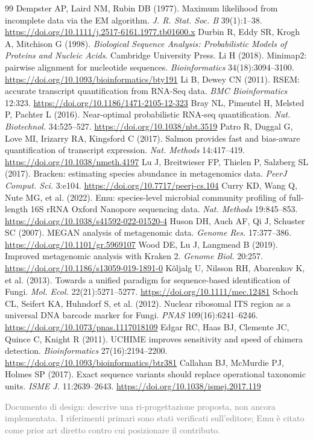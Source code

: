\documentclass[11pt,a4paper]{article}
\begin{document}
\begin{thebibliography}{99}\small
{} Dempster AP, Laird NM, Rubin DB (1977). Maximum likelihood from incomplete data via the EM algorithm. \emph{J. R. Stat. Soc. B} 39(1):1--38. \url{https://doi.org/10.1111/j.2517-6161.1977.tb01600.x}
 Durbin R, Eddy SR, Krogh A, Mitchison G (1998). \emph{Biological Sequence Analysis: Probabilistic Models of Proteins and Nucleic Acids}. Cambridge University Press.
 Li H (2018). Minimap2: pairwise alignment for nucleotide sequences. \emph{Bioinformatics} 34(18):3094--3100. \url{https://doi.org/10.1093/bioinformatics/bty191}
 Li B, Dewey CN (2011). RSEM: accurate transcript quantification from RNA-Seq data. \emph{BMC Bioinformatics} 12:323. \url{https://doi.org/10.1186/1471-2105-12-323}
 Bray NL, Pimentel H, Melsted P, Pachter L (2016). Near-optimal probabilistic RNA-seq quantification. \emph{Nat. Biotechnol.} 34:525--527. \url{https://doi.org/10.1038/nbt.3519}
 Patro R, Duggal G, Love MI, Irizarry RA, Kingsford C (2017). Salmon provides fast and bias-aware quantification of transcript expression. \emph{Nat. Methods} 14:417--419. \url{https://doi.org/10.1038/nmeth.4197}
 Lu J, Breitwieser FP, Thielen P, Salzberg SL (2017). Bracken: estimating species abundance in metagenomics data. \emph{PeerJ Comput. Sci.} 3:e104. \url{https://doi.org/10.7717/peerj-cs.104}
 Curry KD, Wang Q, Nute MG, et al. (2022). Emu: species-level microbial community profiling of full-length 16S rRNA Oxford Nanopore sequencing data. \emph{Nat. Methods} 19:845--853. \url{https://doi.org/10.1038/s41592-022-01520-4}
 Huson DH, Auch AF, Qi J, Schuster SC (2007). MEGAN analysis of metagenomic data. \emph{Genome Res.} 17:377--386. \url{https://doi.org/10.1101/gr.5969107}
 Wood DE, Lu J, Langmead B (2019). Improved metagenomic analysis with Kraken 2. \emph{Genome Biol.} 20:257. \url{https://doi.org/10.1186/s13059-019-1891-0}
 K\~oljalg U, Nilsson RH, Abarenkov K, et al. (2013). Towards a unified paradigm for sequence-based identification of Fungi. \emph{Mol. Ecol.} 22(21):5271--5277. \url{https://doi.org/10.1111/mec.12481}
 Schoch CL, Seifert KA, Huhndorf S, et al. (2012). Nuclear ribosomal ITS region as a universal DNA barcode marker for Fungi. \emph{PNAS} 109(16):6241--6246. \url{https://doi.org/10.1073/pnas.1117018109}
 Edgar RC, Haas BJ, Clemente JC, Quince C, Knight R (2011). UCHIME improves sensitivity and speed of chimera detection. \emph{Bioinformatics} 27(16):2194--2200. \url{https://doi.org/10.1093/bioinformatics/btr381}
 Callahan BJ, McMurdie PJ, Holmes SP (2017). Exact sequence variants should replace operational taxonomic units. \emph{ISME J.} 11:2639--2643. \url{https://doi.org/10.1038/ismej.2017.119}
\end{thebibliography}

\vspace{0.3cm}\noindent\footnotesize\textcolor{gray}{Documento di design: descrive una ri-progettazione proposta, non ancora implementata. I riferimenti primari sono stati verificati sull'editore; Emu \`e citato come prior art diretto contro cui posizionare il contributo.}
\end{document}
